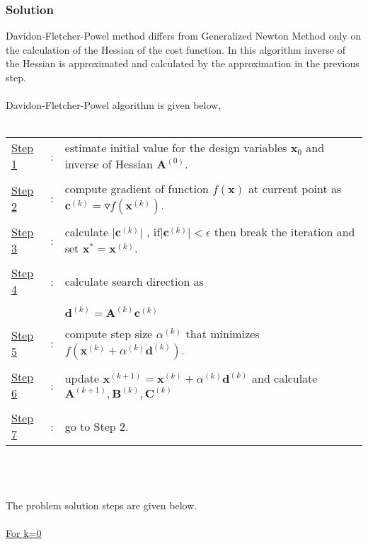 \documentclass[]{report}
\begin{document}
\subsubsection*{Solution}
Davidon-Fletcher-Powel method differs from Generalized Newton Method only on the calculation of the Hessian of the cost function. In this algorithm inverse of the Hessian is approximated and calculated by the approximation in the previous step.
\\~\\
 Davidon-Fletcher-Powel algorithm is given below,
\\
~\\
\begin{tabular}{lll}
\underline{Step 1} &:& estimate initial value for the design variables $\mathbf x_0$ and inverse of Hessian $\mathbf{A}^{(0)}$.\\ 
&&\\
 \underline{Step 2} &:& compute gradient of function $f\left(\mathbf x\right)$ at current point as $\mathbf c^{(k)}=\triangledown f\left(\mathbf x^{(k)}\right)$.\\ 
 &&\\
 \underline{Step 3} &:& calculate $\lvert \mathbf c^{(k)}\rvert$ ,  if$\lvert \mathbf c^{(k)}\rvert<\epsilon$ then break the iteration and set $\mathbf x^*=\mathbf x^{(k)}$. \\ 
 &&\\
 \underline{Step 4} &:& calculate search direction as\\ 
  &&\\
  && $\mathbf d^{(k)}={\mathbf{A}^{(k)}} \mathbf{c}^{(k)}$   \\ 
 &&\\
 \underline{Step 5} &:& compute step size $\alpha^{(k)}$ that minimizes $f\left(\mathbf x^{(k)}+\alpha^{(k)}\mathbf d^{(k)}\right)$. \\ 
 &&\\
 \underline{Step 6} &:& update $\mathbf x^{(k+1)}=\mathbf x^{(k)}+\alpha^{(k)}\mathbf d^{(k)}$ and calculate $\mathbf{A}^{(k+1)}, \mathbf{B}^{(k)}, \mathbf{C}^{(k)}$\\
  &&\\
\underline{Step 7} &:& go to Step 2.
\end{tabular} 
\\
~
\\~\\
The problem solution steps are given below.
~\\~\\
\underline{For k=0}
\end{document}

